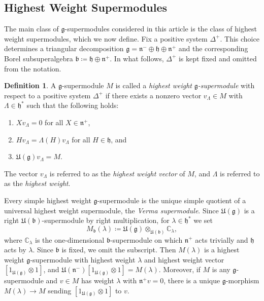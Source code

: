 \documentclass[11pt]{amsart}
\def\CC{{\mathbb C}}
\def\hh{{\mathfrak h}}
\def\bb{{\mathfrak b}}
\def\nn {{\mathfrak{n}}}
\def\gg{{\mathfrak{g}}}
\def\UE{{\mathfrak U}}
\theoremstyle{plain}
\theoremstyle{remark}
\theoremstyle{definition}
\newtheorem{definition}[theorem]{Definition}
\numberwithin{equation}{section}
\theoremstyle{remark}
\begin{document}
\subsection{Highest Weight Supermodules}
\label{subsubsec::Highest_weight_supermodules} The main class of $\gg$-supermodules considered in this article is the class of highest weight supermodules, which we now define. Fix a positive system $\Delta^{+}$. This choice determines a triangular decomposition $\gg=\nn^{-}\oplus\hh\oplus\nn^{+}$ and the corresponding Borel subsuperalgebra $\bb\coloneqq \hh\oplus\nn^{+}$. In what follows, $\Delta^{+}$ is kept fixed and omitted from the notation.
\begin{definition}
 A $\gg$-supermodule $M$ is called a \emph{highest weight} $\gg$\emph{-supermodule} with respect to a positive system $\Delta^{+}$ if there exists a nonzero vector $v_{\Lambda} \in M$ with $\Lambda \in \hh^{\ast}$ such that the following holds:
\begin{enumerate}
 \item[a)] $Xv_{\Lambda}=0$ for all $X \in \nn^{+}$,
 \item[b)] $Hv_{\Lambda}=\Lambda(H)v_{\Lambda}$ for all $H \in \hh$, and 
 \item[c)] $\mathfrak{U}(\gg)v_{\Lambda}=M$.
\end{enumerate}
The vector $v_{\Lambda}$ is referred to as the \emph{highest weight vector} of $M$, and $\Lambda$ is referred to as the \emph{highest weight}.
\end{definition}

Every simple highest weight $\gg$-supermodule is the unique simple quotient of a universal highest weight supermodule, the \emph{Verma supermodule}. Since $\mathfrak{U}(\gg)$ is a right $\UE(\bb)$-supermodule by right multiplication, for $\lambda\in\hh^{\ast}$ we set
\begin{equation}\label{eq::Verma_supermodules}
M_{\bb}(\lambda)\coloneqq \mathfrak{U}(\gg)\otimes_{\UE(\bb)}\CC_{\lambda},
\end{equation}
where $\CC_{\lambda}$ is the one-dimensional $\bb$-supermodule on which $\nn^{+}$ acts trivially and $\hh$ acts by $\lambda$.
Since $\bb$ is fixed, we omit the subscript. Then $M(\lambda)$ is a highest weight $\gg$-supermodule with highest weight $\lambda$ and highest weight vector $[1_{\mathfrak{U}(\gg)}\otimes 1]$, and $\UE(\nn^{-})[1_{\mathfrak{U}(\gg)}\otimes 1]=M(\lambda)$. Moreover, if $M$ is any $\gg$-supermodule and $v\in M$ has weight $\lambda$ with $\nn^{+}v=0$, there is a unique $\gg$-morphism $M(\lambda)\to M$ sending $[1_{\mathfrak{U}(\gg)}\otimes 1]$ to $v$.
\end{document}
